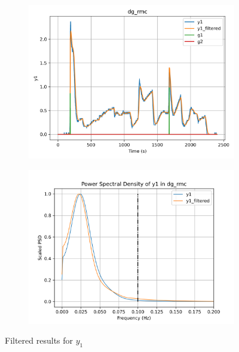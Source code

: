 \begin{figure}[H]

\begin{minipage}{0.49\textwidth}
        \begin{figure}[H]
                \centering
                \includegraphics[width = \textwidth]{./figs/tst_filt/dg_rmc/y1.png}
        \end{figure}
\end{minipage}
\begin{minipage}{0.49\textwidth}
        \begin{figure}[H]
                \centering
                \includegraphics[width = \textwidth]{./figs/tst_filt/dg_rmc/y1_psd.png}
        \end{figure}
\end{minipage}
\caption{Filtered results for $y_1$}

\end{figure}

